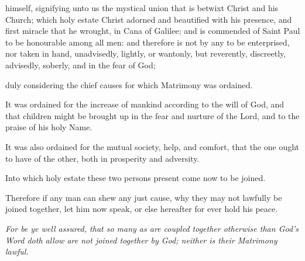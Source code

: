 himself, %
signifying unto us the mystical union that is betwixt Christ and his Church; which holy estate Christ adorned and beautified with his presence, and first miracle that he wrought, in Cana of Galilee; and is commended of Saint Paul to be honourable among all men: and therefore is not by any to be enterprised, nor taken in hand, unadvisedly, lightly, or wantonly,
but reverently, discreetly, advisedly, soberly, and in the fear of God;
\begin{leftbar}
duly considering the 
chief %
causes for which Matrimony was ordained.

It was ordained for the 
increase of mankind according to the will of God, and that children might %
be brought up in the fear and nurture of the Lord, and to the praise of his holy Name.


It was 
also %
ordained for the mutual society, help, and comfort, that the one ought to have of the other, both in prosperity and adversity.
\end{leftbar}

Into which holy estate these two persons present come now to be joined.

Therefore if any man can shew any just cause, why they may not lawfully be joined together, let him now speak, or else hereafter for ever hold his peace.

\smallskip
{}
 \emph{For be ye well assured, that so many as are coupled together otherwise than God's Word doth allow are not joined together by God; neither is their Matrimony lawful.}


